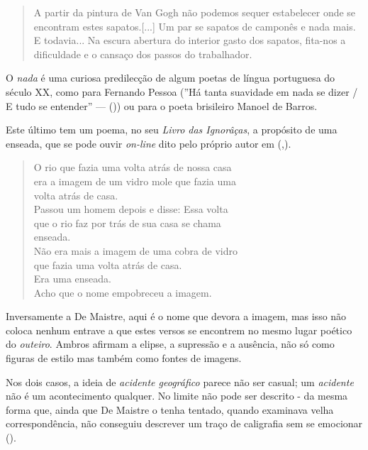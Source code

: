 \documentclass[12pt]{article}
\newenvironment{citacao}
{\begin{quote}
    \begin{small}
      \itshape
      \linespread{1}
}
{\end{small}\end{quote}}
\begin{document}
\singlespacing

\begin{citacao}
  A partir da pintura de Van Gogh não podemos sequer estabelecer onde
  se encontram estes sapatos.[...] Um par se sapatos de camponês e
  nada mais. E todavia...  Na escura abertura do interior gasto dos
  sapatos, fita-nos a dificuldade e o cansaço dos passos do
  trabalhador.
\end{citacao}

\doublespacing

O \emph{nada} é uma curiosa predilecção de algum poetas de língua
portuguesa do século XX, como para Fernando Pessoa (''Há tanta
suavidade em nada se dizer / E tudo se entender'' — (\cite{pessoa}))
ou para o poeta brisileiro Manoel de Barros.

Este último tem um poema, no seu \emph{Livro das Ignorâças}, a
propósito de uma enseada, que se pode ouvir \emph{on-line} dito pelo
próprio autor em (\cite{vidabreve},\cite{manoel}).

\singlespacing

\begin{citacao}
  O rio que fazia uma volta atrás de nossa casa\\
era a imagem de um vidro mole que fazia uma\\
volta atrás de casa.\\
Passou um homem depois e disse: Essa volta\\
que o rio faz por trás de sua casa se chama\\
enseada.\\
Não era mais a imagem de uma cobra de vidro\\
que fazia uma volta atrás de casa.\\
Era uma enseada.\\

Acho que o nome empobreceu a imagem. \\
\end{citacao}

\doublespacing

Inversamente a De Maistre, aqui é o nome que devora a imagem, mas isso
não coloca nenhum entrave a que estes versos se encontrem no mesmo
lugar poético do \emph{outeiro}. Ambros afirmam a elipse, a supressão
e a ausência, não só como figuras de estilo mas também como fontes de
imagens.

Nos dois casos, a ideia de \emph{acidente geográfico} parece não ser
casual; um \emph{acidente} não é um acontecimento qualquer. No limite
não pode ser descrito - da mesma forma que, ainda que De Maistre o
tenha tentado, quando examinava velha correspondência, não conseguiu
descrever um traço de caligrafia sem se emocionar
(\cite[p.84]{demaistre}).
\end{document}
